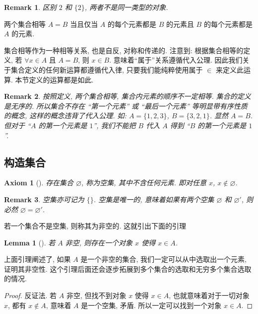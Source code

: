 \documentclass[UTF8]{ctexart}
\theoremstyle{mystyle}
\newtheorem{axiom}{Axiom}[section]
\newtheorem{lemma}{Lemma}[section]
\theoremstyle{myremark}
\newtheorem*{remark}{Remark}
\theoremstyle{plain}
\newcommand{\set}[1]{\{#1\}}
\begin{document}
\begin{remark}
    区别 $ 2 $ 和 $ \set{2} $, 两者不是同一类型的对象.
\end{remark}

\begin{definition}
    两个集合相等 $ A = B $ 当且仅当 $ A $ 的每个元素都是 $ B $ 的元素且 $ B $ 的每个元素都是 $ A $ 的元素.
\end{definition}

集合相等作为一种相等关系, 也是自反, 对称和传递的. 注意到: 根据集合相等的定义, 若 $ \forall x \in A $ 且 $ A = B $, 则 $ x \in B $. 意味着``属于''关系遵循代入公理. 因此我们关于集合定义的任何新运算都遵循代入律, 只要我们能纯粹使用属于 $ \in $ 来定义此运算. 本节定义的运算都是如此.

\begin{remark}
    按照定义, 两个集合相等, 集合内元素的顺序不一定相等. 集合的定义是无序的. 所以集合不存在 ``第一个元素'' 或 ``最后一个元素'' 等明显带有序性质的概念, 这样的概念违背了代入公理. 如: $ A = \{1, 2, 3 \} $, $ B = \{3, 2, 1\} $. 显然 $ A = B $. 但对于 ``$ A $ 的第一个元素是 $ 1 $'', 我们不能把 $ B $ 代入 $ A $ 得到 ``$ B $ 的第一个元素是 $ 1 $''.
\end{remark}

\subsection{构造集合}
\begin{axiom}[]
    存在集合 $ \varnothing $, 称为空集, 其中不含任何元素. 即对任意 $ x $, $ x \not\in \varnothing $.
\end{axiom}    

\begin{remark}
    空集亦可记为 $ \{\} $. 空集是唯一的, 意味着如果有两个空集 $ \varnothing $ 和 $ \varnothing' $, 则必然 $ \varnothing = \varnothing' $.
\end{remark}

若一个集合不是空集, 则称其为非空的. 这就引出下面的引理

\begin{lemma}[]
    若 $ A $ 非空, 则存在一个对象 $ x $ 使得 $ x \in A $.
\end{lemma}

上面引理阐述了, 如果 $ A $ 是一个非空的集合, 我们一定可以从中选取出一个元素, 证明其非空性. 这个引理后面还会逐步拓展到多个集合的选取和无穷多个集合选取的情况.

\begin{proof}
    反证法. 若 $ A $ 非空, 但找不到对象 $ x $ 使得 $ x \in A $, 也就意味着对于一切对象 $ x $, 都有 $ x \notin A $, 意味着 $ A $ 是一个空集, 矛盾. 所以一定可以找到一个对象 $ x \in A $.
\end{proof}
\end{document}
